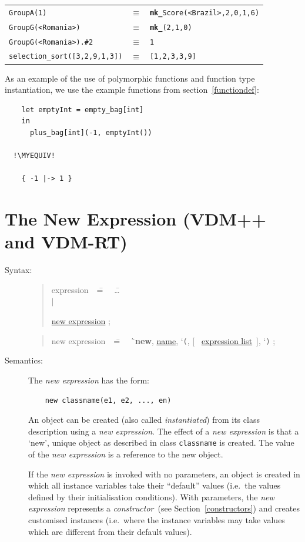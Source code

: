 \documentclass{overturerepchap}
\newcommand{\MYEQUIV}{$\equiv$}
\newcommand{\Lit}[1]{`{\tt #1}\Quote}
\newcommand{\Rule}[2]{
  \begin{quote}\begin{tabbing}
    #1\index{#1}\ \ \= = \ \ \= #2  ; %

  \end{tabbing}\end{quote}
  }
\newcommand{\Ruleref}[1]{
  \hyperlink{rule:#1}{#1}}
\newcommand{\dsep}{\\ \> $|$ \>}
\newcommand{\Lop}[1]{`{\bf\ttfamily #1}\Quote}
\newcommand{\keyw}[1]{{\bf\ttfamily #1}}
\newcommand{\OptPt}[1]{[\ #1\ ]}
\begin{document}
{\begin{description}
  \begin{tabular}{lcl}
  \texttt{GroupA(1)} & $\equiv$ &
                           \texttt{\keyw{mk\_}Score(<Brazil>,2,0,1,6)}\\
  \texttt{GroupG(<Romania>)} & $\equiv$ &
                           \texttt{\keyw{mk\_}(2,1,0)}\\
  \texttt{GroupG(<Romania>).\#2} & $\equiv$ &
                           \texttt{1}\\
  \texttt{selection\_sort([3,2,9,1,3])} & $\equiv$ &
                           \texttt{[1,2,3,3,9]}
  \end{tabular}

  As an example of the use of polymorphic functions and function type
  instantiation, we use the example functions from
  section~\ref{functiondef}:
  \begin{lstlisting}
    let emptyInt = empty_bag[int]
    in
      plus_bag[int](-1, emptyInt())

  !\MYEQUIV!

    { -1 |-> 1 }
  \end{lstlisting}

\end{description}

\section{The New Expression (VDM++ and VDM-RT)}
\label{sec:creation}

\begin{description}
\item[Syntax:]
  \Rule{expression}{
    \ldots \dsep
    \Ruleref{new expression}
    }
  \Rule{new expression}{
    \Lop{new}, \Ruleref{name}, \Lit{(}, \OptPt{\Ruleref{expression list}}, \Lit{)}
  }

\item[Semantics:] The {\it new expression} has the form:

  \begin{lstlisting}
    new classname(e1, e2, ..., en)
  \end{lstlisting}
  An object can be created (also called {\em instantiated}) from its
  class description using a {\it new expression}. The effect of a
  {\it new expression} is that a `new', unique object as described in
  class {\tt classname} is created. The value of the {\it new
  expression} is a reference to the new object.

  If the {\it new expression} is invoked with no parameters, an
  object is created in which all instance variables take their
  ``default'' values (i.e.\ the values defined by their initialisation
  conditions). With parameters, the {\it new expression} represents a
  \emph{constructor}~(see Section~\ref{constructors}) and creates
  customised instances (i.e.\ where the instance variables may take
  values which are different from their default values).



\end{description}}
\end{document}
